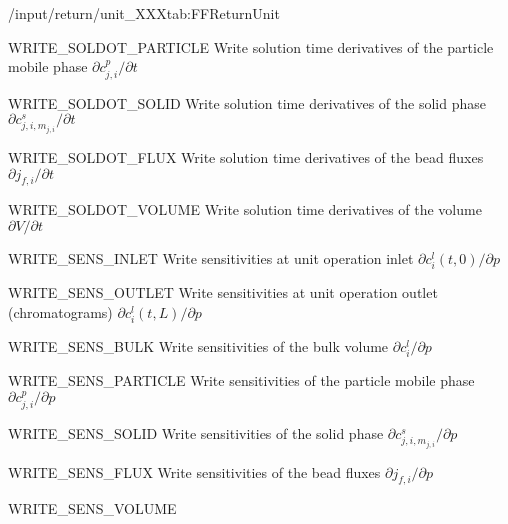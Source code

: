 \begin{groupscope}{/input/return/unit\_XXX}{tab:FFReturnUnit}
  \begin{dataset}[type=int, range={$\{0,1\}$}]{WRITE\_SOLDOT\_PARTICLE}
    Write solution time derivatives of the particle mobile phase $\partial c^p_{j,i} / \partial t$
  \end{dataset}
  \begin{dataset}[type=int, range={$\{0,1\}$}]{WRITE\_SOLDOT\_SOLID}
    Write solution time derivatives of the solid phase $\partial c^s_{j,i,m_{j,i}} / \partial t$
  \end{dataset}
  \begin{dataset}[type=int, range={$\{0,1\}$}]{WRITE\_SOLDOT\_FLUX}
    Write solution time derivatives of the bead fluxes $\partial j_{f,i} / \partial t$
  \end{dataset}
  \begin{dataset}[type=int, range={$\{0,1\}$}]{WRITE\_SOLDOT\_VOLUME}
    Write solution time derivatives of the volume $\partial V / \partial t$
  \end{dataset}
  \begin{dataset}[type=int, range={$\{0,1\}$}]{WRITE\_SENS\_INLET}
    Write sensitivities at unit operation inlet $\partial c^l_i(t,0) / \partial p$
  \end{dataset}
  \begin{dataset}[type=int, range={$\{0,1\}$}]{WRITE\_SENS\_OUTLET}
    Write sensitivities at unit operation outlet (chromatograms) $\partial c^l_i(t,L) / \partial p$
  \end{dataset}
  \begin{dataset}[type=int, range={$\{0,1\}$}]{WRITE\_SENS\_BULK}
    Write sensitivities of the bulk volume $\partial c^l_i / \partial p$
  \end{dataset}
  \begin{dataset}[type=int, range={$\{0,1\}$}]{WRITE\_SENS\_PARTICLE}
    Write sensitivities of the particle mobile phase $\partial c^p_{j,i} / \partial p$
  \end{dataset}
  \begin{dataset}[type=int, range={$\{0,1\}$}]{WRITE\_SENS\_SOLID}
    Write sensitivities of the solid phase $\partial c^s_{j,i,m_{j,i}} / \partial p$
  \end{dataset}
  \begin{dataset}[type=int, range={$\{0,1\}$}]{WRITE\_SENS\_FLUX}
    Write sensitivities of the bead fluxes $\partial j_{f,i} / \partial p$
  \end{dataset}
  \begin{dataset}[type=int, range={$\{0,1\}$}]{WRITE\_SENS\_VOLUME}

\end{dataset}
\end{groupscope}
